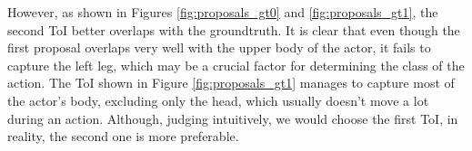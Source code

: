 However, as shown in Figures \ref{fig:proposals_gt0} and \ref{fig:proposals_gt1}, the second ToI better overlaps with the groundtruth. It is clear that even though
the first proposal overlaps very well with the upper body of the actor, it fails to capture the left leg, which may be a crucial factor for determining the class of the
action. The ToI shown in Figure \ref{fig:proposals_gt1} manages to capture most of the actor's body, excluding only the head, which usually doesn't move a lot
during an action. Although, judging intuitively, we would choose the first ToI, in reality, the second one is more preferable.

% 

